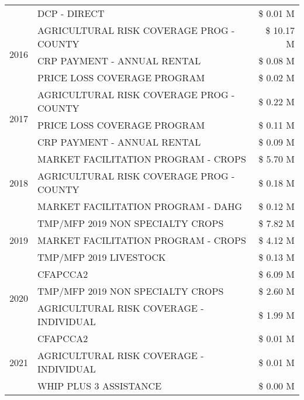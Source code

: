 \begin{tabular}{llr}
 & DCP - DIRECT & \$ 0.01 M \\
\cline{1-3}
\multirow[t]{3}{*}{2016} & AGRICULTURAL RISK COVERAGE PROG - COUNTY      & \$ 10.17 M \\
 & CRP PAYMENT - ANNUAL RENTAL                   & \$ 0.08 M \\
 & PRICE LOSS COVERAGE PROGRAM                   & \$ 0.02 M \\
\cline{1-3}
\multirow[t]{3}{*}{2017} & AGRICULTURAL RISK COVERAGE PROG - COUNTY & \$ 0.22 M \\
 & PRICE LOSS COVERAGE PROGRAM & \$ 0.11 M \\
 & CRP PAYMENT - ANNUAL RENTAL & \$ 0.09 M \\
\cline{1-3}
\multirow[t]{3}{*}{2018} & MARKET FACILITATION PROGRAM - CROPS & \$ 5.70 M \\
 & AGRICULTURAL RISK COVERAGE PROG - COUNTY & \$ 0.18 M \\
 & MARKET FACILITATION PROGRAM - DAHG & \$ 0.12 M \\
\cline{1-3}
\multirow[t]{3}{*}{2019} & TMP/MFP 2019 NON SPECIALTY CROPS & \$ 7.82 M \\
 & MARKET FACILITATION PROGRAM - CROPS & \$ 4.12 M \\
 & TMP/MFP 2019 LIVESTOCK & \$ 0.13 M \\
\cline{1-3}
\multirow[t]{3}{*}{2020} & CFAPCCA2 & \$ 6.09 M \\
 & TMP/MFP 2019 NON SPECIALTY CROPS & \$ 2.60 M \\
 & AGRICULTURAL RISK COVERAGE - INDIVIDUAL & \$ 1.99 M \\
\cline{1-3}
\multirow[t]{3}{*}{2021} & CFAPCCA2 & \$ 0.01 M \\
 & AGRICULTURAL RISK COVERAGE - INDIVIDUAL & \$ 0.01 M \\
 & WHIP PLUS 3 ASSISTANCE & \$ 0.00 M \\
\cline{1-3}
\bottomrule
\end{tabular}
